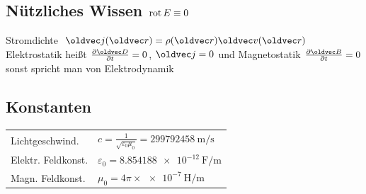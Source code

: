 \documentclass[6pt,a4paper]{scrartcl}
\let\vec\oldvec
\begin{document}
\vspace{-4mm}
\begin{multicols}{4}
\vspace{-4mm} %
\section{Nützliches Wissen $\operatorname{rot} E \equiv 0$}
Stromdichte $\vec j(\vec r) = \rho(\vec r) \vec v(\vec r)$\\
Elektrostatik heißt $\frac{\partial \vec D}{\partial t} = 0$, $\vec j = 0$ und Magnetostatik $\frac{\partial \vec B}{\partial t} = 0$ sonst spricht man von Elektrodynamik

\subsection{Konstanten}
\begin{tabular*}{\columnwidth}{@{\extracolsep\fill}ll@{}} \trule
	Lichtgeschwind. & $c = \frac{1}{\sqrt{\varepsilon_0 \mu_0}} = \SI{299 792 458}{\meter\per\second}$\\
	Elektr. Feldkonst. & $\varepsilon_0 = \SI{8.854 188e-12}{\farad\per\meter}$\\
	Magn. Feldkonst. & $\mu_0 = 4\pi \times \SI{e-7}{\henry\per\meter}$\\
\end{tabular*}


\end{multicols}
\end{document}
